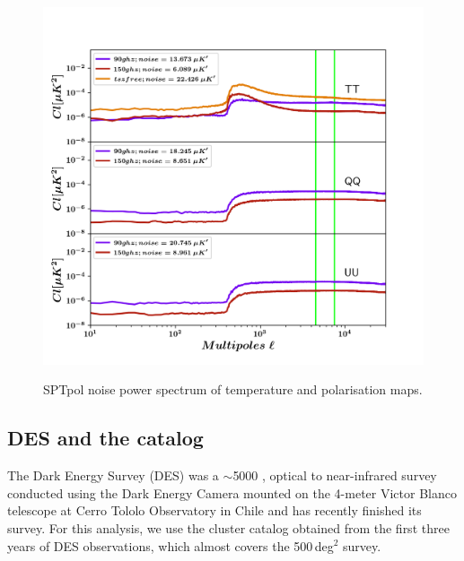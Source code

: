 \begin{figure}[ht]
\includegraphics[width= \columnwidth]{figs/noise_Cls_sanjay_maps_20170603.png}
\label{noise_ps}
\caption{SPTpol noise power spectrum of temperature and polarisation maps.}
\end{figure}
\subsection{DES and the {\rm \RM} catalog}\label{sec_DES}
The Dark Energy Survey (DES) was a $\sim$5000 \sqdeg, optical to near-infrared survey conducted using the Dark Energy Camera \citep{flaugher15} mounted on the 4-meter Victor Blanco telescope at Cerro Tololo Observatory in Chile and has recently finished its survey. 
For this analysis, we use the cluster catalog obtained from the first three years of DES observations, which almost covers the \sptpol{} 500\,deg$^{2}$ survey. 


